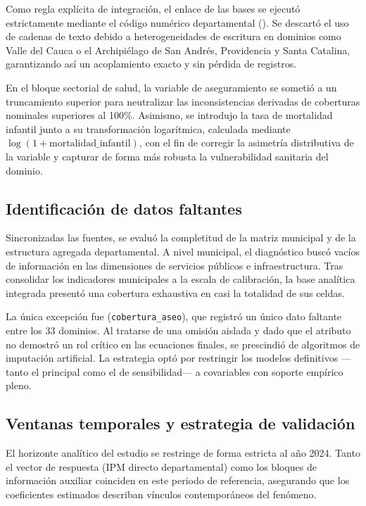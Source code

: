 Como regla explícita de integración, el enlace de las bases se ejecutó estrictamente mediante el código numérico departamental (\texttt{}). Se descartó el uso de cadenas de texto debido a heterogeneidades de escritura en dominios como Valle del Cauca o el Archipiélago de San Andrés, Providencia y Santa Catalina, garantizando así un acoplamiento exacto y sin pérdida de registros. 

En el bloque sectorial de salud, la variable de aseguramiento se sometió a un truncamiento superior para neutralizar las inconsistencias derivadas de coberturas nominales superiores al 100\%. Asimismo, se introdujo la tasa de mortalidad infantil junto a su transformación logarítmica, calculada mediante $\log(1 + \text{mortalidad\_infantil})$, con el fin de corregir la asimetría distributiva de la variable y capturar de forma más robusta la vulnerabilidad sanitaria del dominio.

\subsection{Identificación de datos faltantes}
Sincronizadas las fuentes, se evaluó la completitud de la matriz municipal y de la estructura agregada departamental. A nivel municipal, el diagnóstico buscó vacíos de información en las dimensiones de servicios públicos e infraestructura. Tras consolidar los indicadores municipales a la escala de calibración, la base analítica integrada presentó una cobertura exhaustiva en casi la totalidad de sus celdas. 

La única excepción fue (\texttt{cobertura\_aseo}), que registró un único dato faltante entre los 33 dominios. Al tratarse de una omisión aislada y dado que el atributo no demostró un rol crítico en las ecuaciones finales, se prescindió de algoritmos de imputación artificial. La estrategia optó por restringir los modelos definitivos —tanto el principal como el de sensibilidad— a covariables con soporte empírico pleno.

\subsection{Ventanas temporales y estrategia de validación}
El horizonte analítico del estudio se restringe de forma estricta al año 2024. Tanto el vector de respuesta (IPM directo departamental) como los bloques de información auxiliar coinciden en este periodo de referencia, asegurando que los coeficientes estimados describan vínculos contemporáneos del fenómeno.

